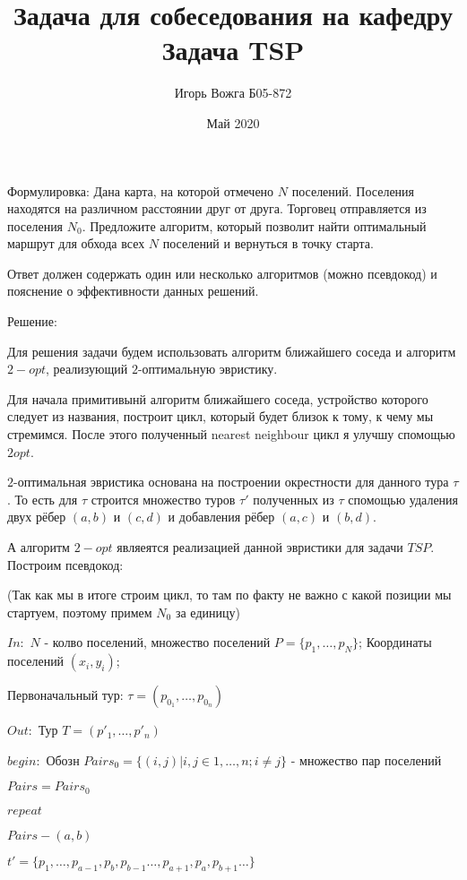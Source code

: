 \documentclass[a4paper,12pt]{article}
\begin{document}
	
\title{Задача для собеседования на кафедру}
	
\author{Игорь Вожга Б05-872 }
\date{Май 2020}
\maketitle
\newpage
\title{ \bf{Задача TSP}}

Формулировка: Дана карта, на которой отмечено $N$ поселений. Поселения находятся на различном расстоянии друг от друга. Торговец отправляется из поселения $N_0$. Предложите алгоритм, который позволит найти оптимальный маршрут для обхода всех $N$ поселений и вернуться в точку старта.

Ответ должен содержать один или несколько алгоритмов (можно псевдокод) и пояснение о эффективности данных решений.

Решение:

Для решения задачи будем использовать алгоритм ближайшего соседа и алгоритм $2-opt$, реализующий  $2$-оптимальную эвристику.

Для начала примитивынй алгоритм ближайшего соседа, устройство которого следует из названия, построит цикл, который будет близок к тому, к чему мы стремимся. После этого полученный nearest neighbour цикл я улучшу спомощью $2opt$.

$2$-оптимальная эвристика основана на построении окрестности для данного тура $\tau$. То есть для $\tau$ строится множество туров $\tau'$ полученных из $\tau$ спомощью удаления двух рёбер $(a,b)$ и $(c, d)$ и добавления рёбер $(a, c)$ и $(b, d)$. 

А алгоритм $2-opt$  являеятся реализацией данной эвристики для задачи $TSP$. Построим псевдокод:

(Так как мы в итоге строим цикл, то там по факту не важно с какой позиции мы стартуем, поэтому примем $N_0$ за единицу)

$In:$ $N$ - колво поселений, множество поселений $P =\{p_1, \dots, p_N\} $; Координаты поселений $(x_i, y_i)$; 

Первоначальный тур: $\tau = (p_{0_1}, \dots , p_{0_n})$

$Out:$ Тур $T=(p'_1, \dots, p'_n)$

$begin:$
Обозн $Pairs_0=\{(i,j)| i, j \in {1,\dots,n} ;i\neq j \} $ - множество пар поселений

$Pairs = Pairs_0$

$repeat$

$Pairs - (a, b)$

$t' = \{p_1, \dots, p_{a-1}, p_{b}, p_{b-1} \dots , p_{a+1}, p_a, p_{b+1} \dots\}$
\end{document}
